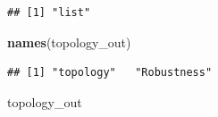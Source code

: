 \documentclass[
]{book}
\newenvironment{Shaded}{\begin{snugshade}}{\end{snugshade}}
\newcommand{\FunctionTok}[1]{\textcolor[rgb]{0.13,0.29,0.53}{\textbf{#1}}}
\newcommand{\NormalTok}[1]{#1}
\begin{document}
\begin{verbatim}
## [1] "list"
\end{verbatim}

\begin{Shaded}
\begin{Highlighting}[]
\FunctionTok{names}\NormalTok{(topology\_out)}
\end{Highlighting}
\end{Shaded}

\begin{verbatim}
## [1] "topology"   "Robustness"
\end{verbatim}

\begin{Shaded}
\begin{Highlighting}[]
\NormalTok{topology\_out}
\end{Highlighting}
\end{Shaded}
\end{document}
